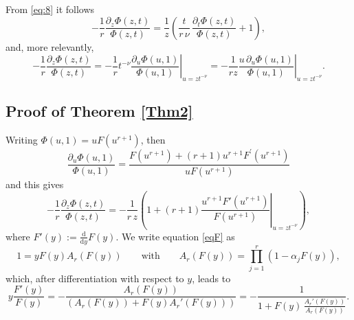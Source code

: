 \documentclass[12pt]{article}
\numberwithin{equation}{section}
\begin{document}
From \eqref{eq:8} it follows
\begin{equation*}
	-  \frac{1}{r}\frac{\partial_z \Phi(z,t)}{\Phi(z,t)} 
	 = \frac{1}{z} \left(\frac{t}{r\,\nu} \, \frac{\partial_t \Phi(z,t)}{\Phi(z,t)} + 1 \right) , 
\end{equation*}
and, more relevantly, 
\begin{equation*}
	-  \frac{1}{r}\frac{\partial_z \Phi(z,t)}{\Phi(z,t)} 
	= -  \frac{1}{r} {t}^{- \nu} \left.\frac{\partial_u\Phi( u,1)}{\Phi(u,1)}\right|_{u=z {t}^{-\nu}}
	= -  \frac{1}{r z}  \left.\frac{u \, \partial_u\Phi( u,1)}{\Phi(u,1)}\right|_{u=z {t}^{-\nu}}.
\end{equation*}



\subsection{Proof of Theorem \ref{Thm2}}\label{Subsec Proof Thm2}


Writing $\Phi(u,1) = u F(u^{r+1})$, then 
\[
	\frac{\partial_u \Phi(u,1)}{\Phi(u,1)} = \frac{F(u^{r+1}) +  (r+1) u^{r+1}  F^\prime (u^{r+1})}{uF(u^{r+1}) }
\]
and this gives 
\[
	-  \frac{1}{r}\frac{\partial_z \Phi(z,t)}{\Phi(z,t)} 
	= -  \frac{1}{r\,z}  \left( 1+ (r+1) \left.\frac{ u^{r+1} F'(u^{r+1})}{F(u^{r+1})}\right|_{u=z {t}^{-\nu}} \right), 
\]
where $F'(y) := \frac{\mathrm{d}}{\mathrm{d}y} F(y)$. We write equation \eqref{eqF} as 
\[
	1= y F(y) A_r(F(y))  \qquad \text{with} \qquad A_r(F(y)) =  \prod_{j=1}^r \left(1 -\alpha_j F(y)\right), 
\]
which, after differentiation with respect to $y$, leads to 
\[
	y \frac{F'(y)}{F(y)} = -  \frac{A_r(F(y))}{\left( A_r(F(y)) + F(y) A_r' (F(y))\right)} =  -  \frac{1}{1 + F(y) \, \frac{A_r' (F(y))}{A_r(F(y))}}. 
\]
\end{document}
